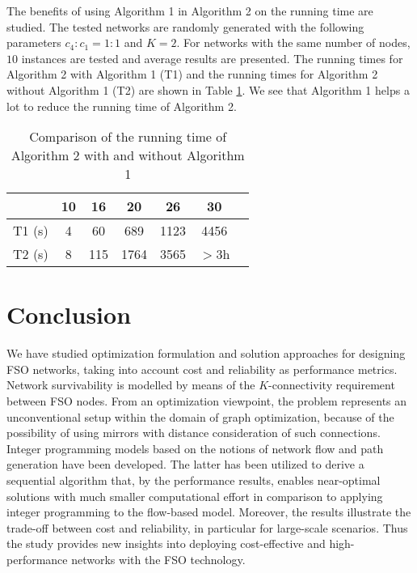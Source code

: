 \documentclass[onecolumn,11pt,draftclsnofoot]{IEEEtran}
\begin{document}
The benefits of using Algorithm 1 in Algorithm 2 on the running time are studied.
The tested networks are randomly generated with the following parameters $c_4:c_1 = 1:1$ and $K=2$. For networks with the same number of nodes, $10$ instances are tested and average results are presented. The running times for Algorithm 2 with Algorithm 1 (T1) and the running times for Algorithm 2 without Algorithm 1 (T2) are shown in Table \ref{tab:algorithm1}. We see that Algorithm 1 helps a lot to reduce the running time of Algorithm 2.

\begin{table}[!htbp]
\setlength{\tabcolsep}{17pt}
\center
\caption{Comparison of the running time of Algorithm 2 with and without Algorithm 1}
\label{tab:algorithm1}
\begin{tabular}{|c|c|c|c|c|c|c|}
\hline
         & 10 & 16 & 20 & 26 & 30\\
\hline
T1 (s)  & 4  &60  &689  &1123 &4456\\
\hline
T2 (s)  & 8  &115  &1764  &3565  &$>$3h\\
\hline
\end{tabular}
\hfill
\end{table}

\section{Conclusion} \label{sec:conclusion}
We have studied optimization formulation and solution approaches for designing FSO networks, taking into account cost and reliability as performance metrics. Network survivability is modelled by means of the $K$-connectivity requirement between FSO nodes. From an optimization viewpoint, the problem represents an unconventional setup within the domain of graph optimization, because of the possibility of using mirrors with distance consideration of such connections. Integer programming models based on the notions of network flow and path generation have been developed. The latter has been utilized to derive a sequential algorithm that, by the performance results, enables near-optimal solutions with much smaller computational effort in comparison to applying integer programming to the flow-based model. Moreover, the results illustrate the trade-off between cost and reliability, in particular for large-scale scenarios. Thus the study provides new insights into deploying cost-effective and high-performance networks with the FSO technology.



\end{document}
